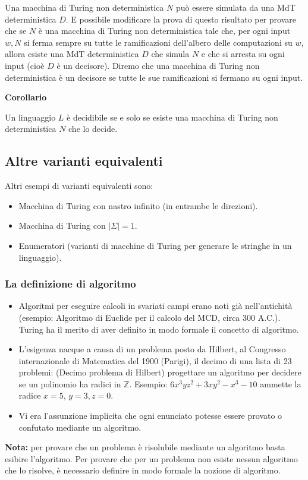 \vspace{5mm}

Una macchina di Turing non deterministica $N$ può essere simulata da una MdT deterministica $D$. E possibile modificare la prova di questo risultato per provare che se $N$ è una macchina di Turing non deterministica tale che, per ogni input $w, N$ si ferma sempre su tutte le ramificazioni dell'albero delle computazioni su $w$, allora esiste una MdT deterministica $D$ che simula $N$ e che si arresta su ogni input (cioè $D$ è un decisore). Diremo che una macchina di Turing non deterministica è un decisore se tutte le sue ramificazioni si fermano su ogni input.

\vspace{5mm}


\textbf{Corollario}

Un linguaggio $L$ è decidibile se e solo se esiste una macchina di Turing non deterministica $N$ che lo decide.


\subsection{Altre varianti equivalenti}

Altri esempi di varianti equivalenti sono:
\begin{itemize}
    \item Macchina di Turing con nastro infinito (in entrambe le direzioni).
    \item Macchina di Turing con $|\Sigma|=1$.
    \item Enumeratori (varianti di macchine di Turing per generare le stringhe in un linguaggio).
\end{itemize}

\subsubsection{La definizione di algoritmo}
\begin{itemize}
    \item Algoritmi per eseguire calcoli in svariati campi erano noti già nell'antichità (esempio: Algoritmo di Euclide per il calcolo del MCD, circa 300 A.C.).
Turing ha il merito di aver definito in modo formale il concetto di algoritmo.
    \item L'esigenza nacque a causa di un problema posto da Hilbert, al Congresso internazionale di Matematica del 1900 (Parigi), il decimo di una lista di 23 problemi:
(Decimo problema di Hilbert) progettare un algoritmo per decidere se un polinomio ha radici in $\mathbb{Z}$.
Esempio: $6 x^{3} y z^{2}+3 x y^{2}-x^{3}-10$ ammette la radice $x=5$, $y=3, z=0$.
    \item Vi era l'assunzione implicita che ogni enunciato potesse essere provato o confutato mediante un algoritmo.
\end{itemize}
\textbf{Nota: }per provare che un problema è risolubile mediante un algoritmo basta esibire l'algoritmo.
Per provare che per un problema non esiste nessun algoritmo che lo risolve, è necessario definire in modo formale la nozione di algoritmo.

